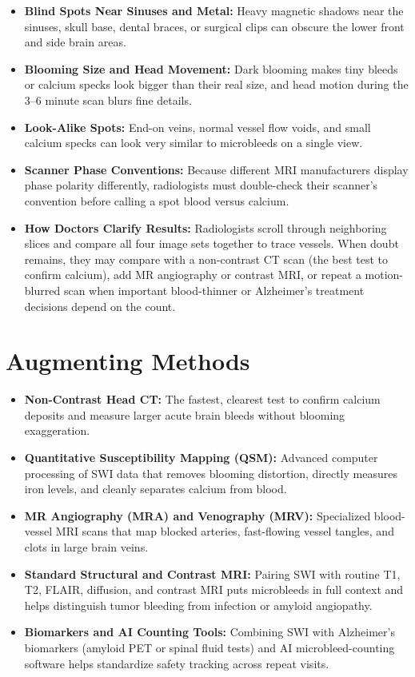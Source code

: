 \begin{itemize}
    \item \textbf{Blind Spots Near Sinuses and Metal:} Heavy magnetic shadows near the sinuses, skull base, dental braces, or surgical clips can obscure the lower front and side brain areas.
    \item \textbf{Blooming Size and Head Movement:} Dark blooming makes tiny bleeds or calcium specks look bigger than their real size, and head motion during the 3--6 minute scan blurs fine details.
    \item \textbf{Look-Alike Spots:} End-on veins, normal vessel flow voids, and small calcium specks can look very similar to microbleeds on a single view.
    \item \textbf{Scanner Phase Conventions:} Because different MRI manufacturers display phase polarity differently, radiologists must double-check their scanner's convention before calling a spot blood versus calcium.
    \item \textbf{How Doctors Clarify Results:} Radiologists scroll through neighboring slices and compare all four image sets together to trace vessels. When doubt remains, they may compare with a non-contrast CT scan (the best test to confirm calcium), add MR angiography or contrast MRI, or repeat a motion-blurred scan when important blood-thinner or Alzheimer's treatment decisions depend on the count.
\end{itemize}

\section{Augmenting Methods}

\begin{itemize}
    \item \textbf{Non-Contrast Head CT:} The fastest, clearest test to confirm calcium deposits and measure larger acute brain bleeds without blooming exaggeration.
    \item \textbf{Quantitative Susceptibility Mapping (QSM):} Advanced computer processing of SWI data that removes blooming distortion, directly measures iron levels, and cleanly separates calcium from blood.
    \item \textbf{MR Angiography (MRA) and Venography (MRV):} Specialized blood-vessel MRI scans that map blocked arteries, fast-flowing vessel tangles, and clots in large brain veins.
    \item \textbf{Standard Structural and Contrast MRI:} Pairing SWI with routine T1, T2, FLAIR, diffusion, and contrast MRI puts microbleeds in full context and helps distinguish tumor bleeding from infection or amyloid angiopathy.
    \item \textbf{Biomarkers and AI Counting Tools:} Combining SWI with Alzheimer's biomarkers (amyloid PET or spinal fluid tests) and AI microbleed-counting software helps standardize safety tracking across repeat visits.
\end{itemize}

